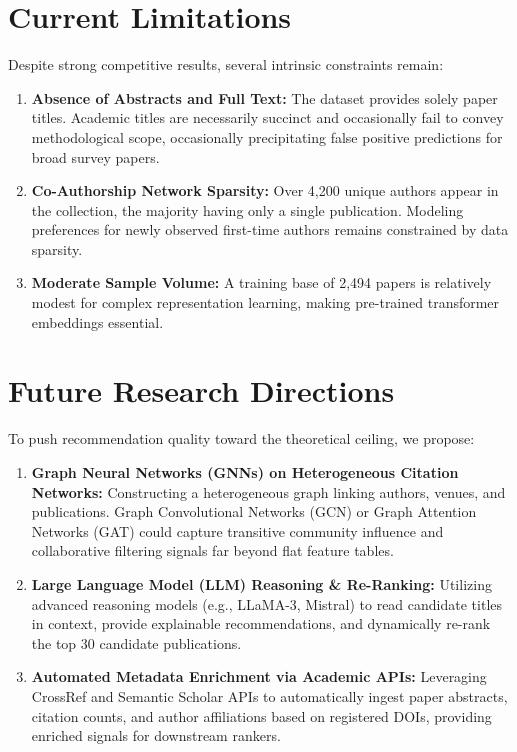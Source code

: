 \section{Current Limitations}
Despite strong competitive results, several intrinsic constraints remain:
\begin{enumerate}
  \item \textbf{Absence of Abstracts and Full Text:} The dataset provides solely paper titles. Academic titles are necessarily succinct and occasionally fail to convey methodological scope, occasionally precipitating false positive predictions for broad survey papers.
  \item \textbf{Co-Authorship Network Sparsity:} Over 4,200 unique authors appear in the collection, the majority having only a single publication. Modeling preferences for newly observed first-time authors remains constrained by data sparsity.
  \item \textbf{Moderate Sample Volume:} A training base of 2,494 papers is relatively modest for complex representation learning, making pre-trained transformer embeddings essential.
\end{enumerate}

\section{Future Research Directions}
To push recommendation quality toward the theoretical ceiling, we propose:
\begin{enumerate}
  \item \textbf{Graph Neural Networks (GNNs) on Heterogeneous Citation Networks:} Constructing a heterogeneous graph linking authors, venues, and publications. Graph Convolutional Networks (GCN) or Graph Attention Networks (GAT) could capture transitive community influence and collaborative filtering signals far beyond flat feature tables.
  \item \textbf{Large Language Model (LLM) Reasoning \& Re-Ranking:} Utilizing advanced reasoning models (e.g., LLaMA-3, Mistral) to read candidate titles in context, provide explainable recommendations, and dynamically re-rank the top 30 candidate publications.
  \item \textbf{Automated Metadata Enrichment via Academic APIs:} Leveraging CrossRef and Semantic Scholar APIs to automatically ingest paper abstracts, citation counts, and author affiliations based on registered DOIs, providing enriched signals for downstream rankers.
\end{enumerate}

